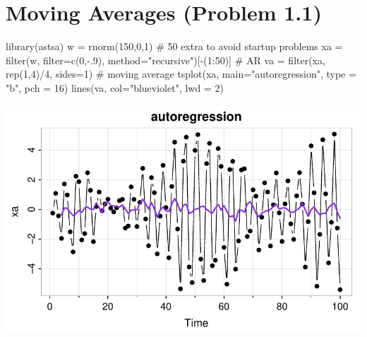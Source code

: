 \documentclass[
  letterpaper,
  DIV=11,
  numbers=noendperiod]{scrreprt}
\newenvironment{Shaded}{\begin{snugshade}}{\end{snugshade}}
\newcommand{\AttributeTok}[1]{\textcolor[rgb]{0.40,0.45,0.13}{#1}}
\newcommand{\CommentTok}[1]{\textcolor[rgb]{0.37,0.37,0.37}{#1}}
\newcommand{\DecValTok}[1]{\textcolor[rgb]{0.68,0.00,0.00}{#1}}
\newcommand{\FunctionTok}[1]{\textcolor[rgb]{0.28,0.35,0.67}{#1}}
\newcommand{\NormalTok}[1]{\textcolor[rgb]{0.00,0.23,0.31}{#1}}
\newcommand{\OtherTok}[1]{\textcolor[rgb]{0.00,0.23,0.31}{#1}}
\newcommand{\SpecialCharTok}[1]{\textcolor[rgb]{0.37,0.37,0.37}{#1}}
\newcommand{\StringTok}[1]{\textcolor[rgb]{0.13,0.47,0.30}{#1}}
\begin{document}
\section{Moving Averages (Problem
1.1)}\label{moving-averages-problem-1.1-1}

\begin{Shaded}
\begin{Highlighting}[]
\FunctionTok{library}\NormalTok{(astsa)}
\NormalTok{w }\OtherTok{=} \FunctionTok{rnorm}\NormalTok{(}\DecValTok{150}\NormalTok{,}\DecValTok{0}\NormalTok{,}\DecValTok{1}\NormalTok{) }\CommentTok{\# 50 extra to avoid startup problems}
\NormalTok{xa }\OtherTok{=} \FunctionTok{filter}\NormalTok{(w, }\AttributeTok{filter=}\FunctionTok{c}\NormalTok{(}\DecValTok{0}\NormalTok{,}\SpecialCharTok{{-}}\NormalTok{.}\DecValTok{9}\NormalTok{), }\AttributeTok{method=}\StringTok{"recursive"}\NormalTok{)[}\SpecialCharTok{{-}}\NormalTok{(}\DecValTok{1}\SpecialCharTok{:}\DecValTok{50}\NormalTok{)] }\CommentTok{\# AR}
\NormalTok{va }\OtherTok{=} \FunctionTok{filter}\NormalTok{(xa, }\FunctionTok{rep}\NormalTok{(}\DecValTok{1}\NormalTok{,}\DecValTok{4}\NormalTok{)}\SpecialCharTok{/}\DecValTok{4}\NormalTok{, }\AttributeTok{sides=}\DecValTok{1}\NormalTok{) }\CommentTok{\# moving average}
\FunctionTok{tsplot}\NormalTok{(xa, }\AttributeTok{main=}\StringTok{"autoregression"}\NormalTok{, }\AttributeTok{type =} \StringTok{"b"}\NormalTok{, }\AttributeTok{pch =} \DecValTok{16}\NormalTok{)}
\FunctionTok{lines}\NormalTok{(va, }\AttributeTok{col=}\StringTok{"blueviolet"}\NormalTok{, }\AttributeTok{lwd =} \DecValTok{2}\NormalTok{)}
\end{Highlighting}
\end{Shaded}

\includegraphics{LectureNotes/Lecture2_files/figure-pdf/unnamed-chunk-15-1.pdf}
\end{document}
